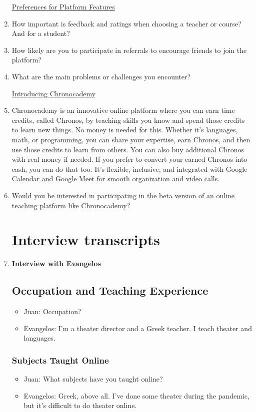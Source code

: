 \begin{enumerate}
    \underline{Preferences for Platform Features}
    \item How important is feedback and ratings when choosing a teacher or course?
    And for a student?
    \item How likely are you to participate in referrals to encourage friends to join the platform?
    \item What are the main problems or challenges you encounter?

    \underline{Introducing Chronocademy}
    \item Chronocademy is an innovative online platform where you can earn time credits, called Chronos, by teaching skills you know and spend those credits to learn new things.
    No money is needed for this.
    Whether it's languages, math, or programming, you can share your expertise, earn Chronos, and then use those credits to learn from others.
    You can also buy additional Chronos with real money if needed.
    If you prefer to convert your earned Chronos into cash, you can do that too.
    It's flexible, inclusive, and integrated with Google Calendar and Google Meet for smooth organization and video calls.

    \item Would you be interested in participating in the beta version of an online teaching platform like Chronocademy?


    \section{Interview transcripts}\label{sec:interview-transcripts}

    \item \textbf{Interview with Evangelos}

    \subsection*{Occupation and Teaching Experience}
    \begin{itemize}
        \item Juan: Occupation?
        \item Evangelos: I'm a theater director and a Greek teacher.
        I teach theater and languages.
    \end{itemize}

    \subsubsection*{Subjects Taught Online}
    \begin{itemize}
        \item Juan: What subjects have you taught online?
        \item Evangelos: Greek, above all.
        I’ve done some theater during the pandemic, but it’s difficult to do theater online.
    \end{itemize}


\end{enumerate}
